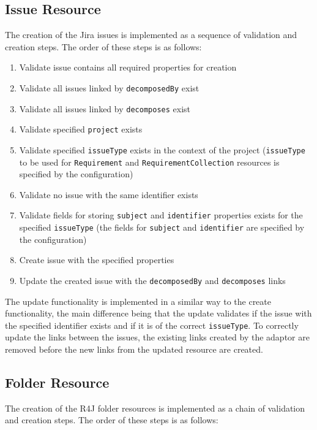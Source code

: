 \subsection*{Issue Resource}
The creation of the Jira issues is implemented as a sequence of validation and creation steps. The order of these steps is as follows:

\begin{enumerate}
  \item Validate issue contains all required properties for creation
  \item Validate all issues linked by \texttt{decomposedBy} exist
  \item Validate all issues linked by \texttt{decomposes} exist
  \item Validate specified \texttt{project} exists
  \item Validate specified \texttt{issueType} exists in the context of the project (\texttt{issueType} to be used for \texttt{Requirement} and \texttt{RequirementCollection} resources is specified by the configuration)
  \item Validate no issue with the same identifier exists
  \item Validate fields for storing \texttt{subject} and \texttt{identifier} properties exists for the specified \texttt{issueType} (the fields for \texttt{subject} and \texttt{identifier} are specified by the configuration)
  \item Create issue with the specified properties
  \item Update the created issue with the \texttt{decomposedBy} and \texttt{decomposes} links
\end{enumerate}

The update functionality is implemented in a similar way to the create functionality, the main difference being that the update validates if the issue with the specified identifier exists and if it is of the correct \texttt{issueType}. To correctly update the links between the issues, the existing links created by the adaptor are removed before the new links from the updated resource are created.

\subsection*{Folder Resource}
The creation of the R4J folder resources is implemented as a chain of validation and creation steps. The order of these steps is as follows:

